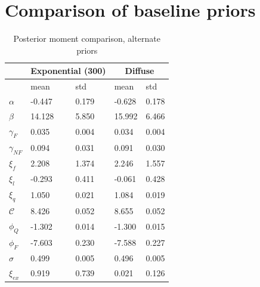 \clearpage 

\section{Comparison of baseline priors} 
\label{sec:prior_comp}

\begin{table}[!ht]
    \centering
    \begin{tabular}{lllll}
        \hline
         & \multicolumn{2}{c}{Exponential (300)}        & \multicolumn{2}{c}{Diffuse} \\ \hline                            & mean    & std   & mean       & std    \\ \hline \hline
         $\alpha$             & -0.447 & 0.179 & -0.628 & 0.178 \\ 
         $\beta$              & 14.128 & 5.850 & 15.992 & 6.466 \\ 
         $\gamma_{F}$         & 0.035  & 0.004 & 0.034  & 0.004 \\ 
         $\gamma_{NF}$        & 0.094  & 0.031 & 0.091  & 0.030 \\ 
         $\xi_f$              & 2.208  & 1.374 & 2.246  & 1.557 \\ 
         $\xi_l$              & -0.293 & 0.411 & -0.061 & 0.428 \\ 
         $\xi_q$              & 1.050  & 0.021 & 1.084  & 0.019 \\ 
         $\mathcal{C}$        & 8.426  & 0.052 & 8.655  & 0.052 \\ 
         $\phi_Q$             & -1.302 & 0.014 & -1.300 & 0.015 \\ 
         $\phi_F$             & -7.603 & 0.230 & -7.588 & 0.227 \\ 
         $\sigma$             & 0.499  & 0.005 & 0.496  & 0.005 \\ 
         $\xi_{ex}$           & 0.919  & 0.739 & 0.021  & 0.126 \\ \hline 
    \end{tabular}                              
    \caption{Posterior moment comparison, alternate priors}
    \label{tab:prior_comp}
\end{table}
